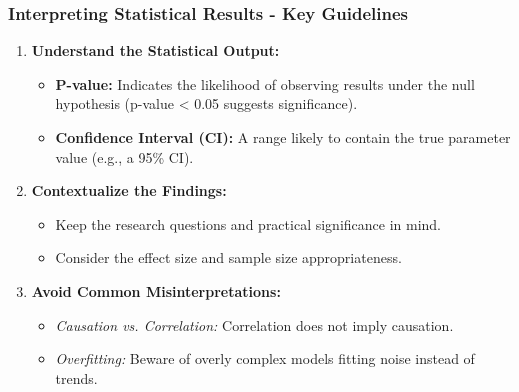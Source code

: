 \documentclass[aspectratio=169]{beamer}
\begin{document}
\begin{frame}[fragile]
    \frametitle{Interpreting Statistical Results - Key Guidelines}
    \begin{enumerate}
        \item \textbf{Understand the Statistical Output:}
        \begin{itemize}
            \item \textbf{P-value:} Indicates the likelihood of observing results under the null hypothesis (p-value < 0.05 suggests significance).
            \item \textbf{Confidence Interval (CI):} A range likely to contain the true parameter value (e.g., a 95\% CI).
        \end{itemize}
        
        \item \textbf{Contextualize the Findings:}
        \begin{itemize}
            \item Keep the research questions and practical significance in mind.
            \item Consider the effect size and sample size appropriateness.
        \end{itemize}
        
        \item \textbf{Avoid Common Misinterpretations:}
        \begin{itemize}
            \item \textit{Causation vs. Correlation:} Correlation does not imply causation.
            \item \textit{Overfitting:} Beware of overly complex models fitting noise instead of trends.
        \end{itemize}
    \end{enumerate}
\end{frame}
\end{document}
